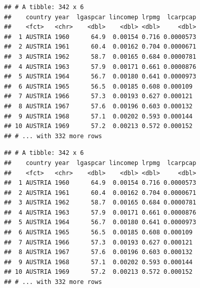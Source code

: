 \documentclass[]{gitbook}
\newenvironment{Shaded}{\begin{snugshade}}{\end{snugshade}}
\newcommand{\KeywordTok}[1]{\textcolor[rgb]{0.13,0.29,0.53}{\textbf{#1}}}
\newcommand{\NormalTok}[1]{#1}
\newcommand{\OperatorTok}[1]{\textcolor[rgb]{0.81,0.36,0.00}{\textbf{#1}}}
\newcommand{\StringTok}[1]{\textcolor[rgb]{0.31,0.60,0.02}{#1}}
\theoremstyle{definition}
\theoremstyle{definition}
\theoremstyle{definition}
\theoremstyle{remark}
\begin{document}
\begin{verbatim}
## # A tibble: 342 x 6
##    country year  lgaspcar lincomep lrpmg  lcarpcap
##    <fct>   <chr>    <dbl>    <dbl> <dbl>     <dbl>
##  1 AUSTRIA 1960      64.9  0.00154 0.716 0.0000573
##  2 AUSTRIA 1961      60.4  0.00162 0.704 0.0000671
##  3 AUSTRIA 1962      58.7  0.00165 0.684 0.0000781
##  4 AUSTRIA 1963      57.9  0.00171 0.661 0.0000876
##  5 AUSTRIA 1964      56.7  0.00180 0.641 0.0000973
##  6 AUSTRIA 1965      56.5  0.00185 0.608 0.000109 
##  7 AUSTRIA 1966      57.3  0.00193 0.627 0.000121 
##  8 AUSTRIA 1967      57.6  0.00196 0.603 0.000132 
##  9 AUSTRIA 1968      57.1  0.00202 0.593 0.000144 
## 10 AUSTRIA 1969      57.2  0.00213 0.572 0.000152 
## # ... with 332 more rows
\end{verbatim}

\begin{Shaded}
\end{Shaded}

\begin{verbatim}
## # A tibble: 342 x 6
##    country year  lgaspcar lincomep lrpmg  lcarpcap
##    <fct>   <chr>    <dbl>    <dbl> <dbl>     <dbl>
##  1 AUSTRIA 1960      64.9  0.00154 0.716 0.0000573
##  2 AUSTRIA 1961      60.4  0.00162 0.704 0.0000671
##  3 AUSTRIA 1962      58.7  0.00165 0.684 0.0000781
##  4 AUSTRIA 1963      57.9  0.00171 0.661 0.0000876
##  5 AUSTRIA 1964      56.7  0.00180 0.641 0.0000973
##  6 AUSTRIA 1965      56.5  0.00185 0.608 0.000109 
##  7 AUSTRIA 1966      57.3  0.00193 0.627 0.000121 
##  8 AUSTRIA 1967      57.6  0.00196 0.603 0.000132 
##  9 AUSTRIA 1968      57.1  0.00202 0.593 0.000144 
## 10 AUSTRIA 1969      57.2  0.00213 0.572 0.000152 
## # ... with 332 more rows
\end{verbatim}

\begin{Shaded}
\end{Shaded}
\end{document}
